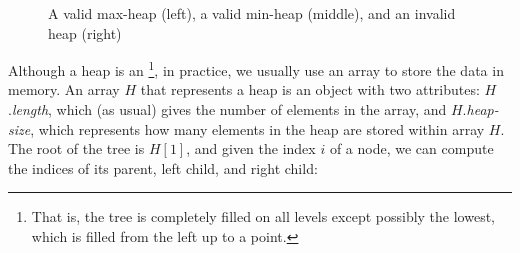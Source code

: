 \begin{figure}[ht!]
    \centering
    \hfill
    \hfill
    \caption{A valid max-heap (left), a valid min-heap (middle), and an invalid heap (right)}
\end{figure}

Although a heap is an  \footnote{That is, the tree is completely filled on all levels except possibly the lowest, which is filled from the left up to a point. }, in practice, we usually use an array to store the data in memory. An array $H$ that represents a heap is an object with two attributes: $H$.\textit{length}, which (as usual) gives the number of elements in the array, and $H$.\textit{heap-size}, which represents how many elements in the heap are stored within array $H$. The root of the tree is $H[1]$, and given the index $i$ of a node, we can compute the indices of its parent, left child, and right child:

